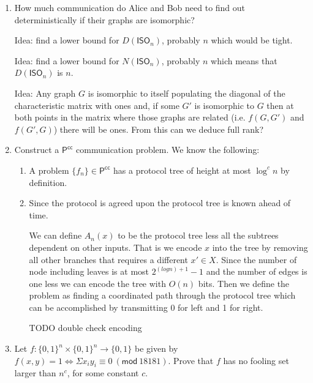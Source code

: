 \documentclass[usletter]{article}
\begin{document}

\begin{enumerate}
  \item How much communication do Alice and Bob need to find out deterministically if their graphs are isomorphic?

  Idea: find a lower bound for $D(\mathsf{ISO}_n)$, probably $n$ which would be tight.

  Idea: find a lower bound for $N(\mathsf{ISO}_n)$, probably $n$ which means that $D(\mathsf{ISO}_n)$ is $n$.

  Idea: Any graph $G$ is isomorphic to itself populating the diagonal of the characteristic matrix with ones and, if some $G'$ is isomorphic to $G$ then at both points in the matrix where those graphs are related (i.e. $f(G, G')$ and $f(G', G)$) there will be ones. From this can we deduce full rank?

  \item Construct a $\mathsf{P}^{\mathsf{cc}}$ communication problem.
    We know the following:

    \begin{enumerate}
      \item A problem $\{f_n\} \in \mathsf{P}^{\mathsf{cc}}$ has a protocol tree of height at most $\log^c n$ by definition.
      \item Since the protocol is agreed upon the protocol tree is known ahead of time.

        We can define $A_n(x)$ to be the protocol tree less all the subtrees dependent on other inputs. That is we encode $x$ into the tree by removing all other branches that requires a different $x' \in X$. Since the number of node including leaves is at most $2^{(log n) + 1} - 1$ and the number of edges is one less we can encode the tree with $O(n)$ bits. Then we define the problem as finding a coordinated path through the protocol tree which can be accomplished by transmitting 0 for left and 1 for right.

        TODO double check encoding

    \end{enumerate}

  \item Let $f : \{0,1\}^n \times \{0,1\}^n \rightarrow \{0,1\}$ be given by $f(x,y) = 1 \Leftrightarrow \Sigma x_i y_i \equiv 0\ (\mathsf{mod}\ 18181)$. Prove that $f$ has no fooling set larger than $n^c$, for some constant $c$.



\end{enumerate}
\end{document}
